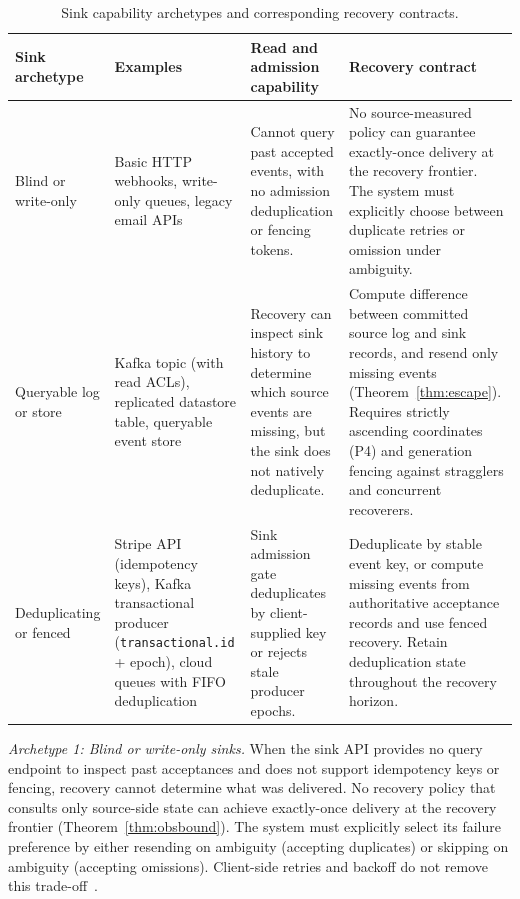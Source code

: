 \documentclass[sigplan,10pt]{acmart}
\theoremstyle{plain}
\theoremstyle{definition}
\let\origtexttt\texttt
\renewcommand{\texttt}[1]{{\origtexttt{\def\_{\textunderscore\allowbreak}#1}}}
\begin{document}
\begin{table}[t]
\caption{Sink capability archetypes and corresponding recovery contracts.}
\label{tab:practitioner-sinks}
\footnotesize
\begin{tabular}{@{}>{\raggedright\arraybackslash}p{}>{\raggedright\arraybackslash}p{}>{\raggedright\arraybackslash}p{}>{\raggedright\arraybackslash}p{}@{}}
\toprule
\textbf{Sink archetype} & \textbf{Examples} & \textbf{Read and admission capability} & \textbf{Recovery contract} \\
\midrule
Blind or write-only &
Basic HTTP webhooks, write-only queues, legacy email APIs &
Cannot query past accepted events, with no admission deduplication or fencing tokens. &
No source-measured policy can guarantee exactly-once delivery at the recovery frontier. The system must explicitly choose between duplicate retries or omission under ambiguity. \\
\addlinespace[3pt]
Queryable log or store &
Kafka topic (with read ACLs), replicated datastore table, queryable event store &
Recovery can inspect sink history to determine which source events are missing, but the sink does not natively deduplicate. &
Compute difference between committed source log and sink records, and resend only missing events (Theorem~\ref{thm:escape}). Requires strictly ascending coordinates (P4) and generation fencing against stragglers and concurrent recoverers. \\
\addlinespace[3pt]
Deduplicating or fenced &
Stripe API (idempotency keys), Kafka transactional producer (\texttt{transactional.id} + epoch), cloud queues with FIFO deduplication &
Sink admission gate deduplicates by client-supplied key or rejects stale producer epochs. &
Deduplicate by stable event key, or compute missing events from authoritative acceptance records and use fenced recovery. Retain deduplication state throughout the recovery horizon. \\
\bottomrule
\end{tabular}
\end{table}

\emph{Archetype 1: Blind or write-only sinks.}
When the sink API provides no query endpoint to inspect past acceptances
and does not support idempotency keys or fencing, recovery cannot determine
what was delivered. No recovery policy that consults only source-side state
can achieve exactly-once delivery at the recovery frontier
(Theorem~\ref{thm:obsbound}). The system must explicitly select its failure
preference by either resending on ambiguity (accepting duplicates) or skipping on
ambiguity (accepting omissions). Client-side retries and backoff do not remove this
trade-off~\cite{treat}.
\end{document}

